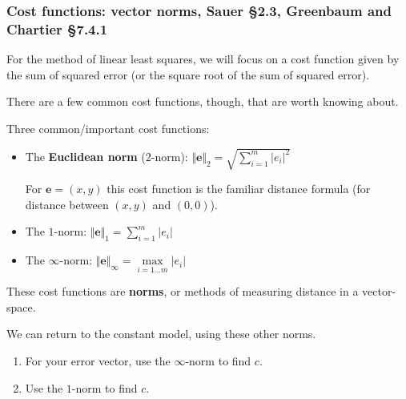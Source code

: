 \documentclass[12pt,letterpaper,noanswers]{exam}
\begin{document}
\subsubsection{Cost functions: vector norms, Sauer \S 2.3, Greenbaum and Chartier \S 7.4.1}

For the method of linear least squares, we will focus on a cost function given by the sum of squared error (or the square root of the sum of squared error).

There are a few common cost functions, though, that are worth knowing about.

\begin{tcolorbox}
Three common/important cost functions:
\begin{itemize}
\itemsep0pt
    \item The \textbf{Euclidean norm} ($2$-norm): $\displaystyle\Vert\textbf{e}\Vert_2 = \sqrt{\sum\limits_{i=1}^m \vert e_i\vert^2}$
    
    For $\mathbf{e} = (x,y)$ this cost function is the familiar distance formula (for distance between $(x,y)$ and $(0,0)$).
    
    \item The $1$-norm: $\displaystyle\Vert\mathbf{e}\Vert_1 = \sum\limits_{i=1}^m \vert e_i\vert$
    
    \item The $\infty$-norm: $\displaystyle\Vert\mathbf{e}\Vert_{\infty} = \max\limits_{i=1...m} \vert e_i\vert$
\end{itemize}
\end{tcolorbox}

These cost functions are \textbf{norms}, or methods of measuring distance in a vector-space.

We can return to the constant model, using these other norms.

\begin{enumerate}[resume]
\item For your error vector, use the $\infty$-norm to find $c$.

\item Use the $1$-norm to find $c$.
\end{enumerate}
\end{document}
